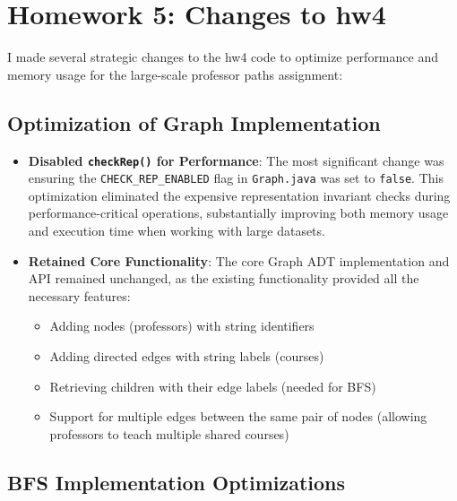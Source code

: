 \documentclass[11pt]{article}
\begin{document}
\section*{Homework 5: Changes to hw4}

I made several strategic changes to the hw4 code to optimize performance and memory usage for the large-scale professor paths assignment:

\subsection*{Optimization of Graph Implementation}

\begin{itemize}
    \item \textbf{Disabled \texttt{checkRep()} for Performance}: The most significant change was ensuring the \texttt{CHECK\_REP\_ENABLED} flag in \texttt{Graph.java} was set to \texttt{false}. This optimization eliminated the expensive representation invariant checks during performance-critical operations, substantially improving both memory usage and execution time when working with large datasets.
    
    \item \textbf{Retained Core Functionality}: The core Graph ADT implementation and API remained unchanged, as the existing functionality provided all the necessary features:
    \begin{itemize}
        \item Adding nodes (professors) with string identifiers
        \item Adding directed edges with string labels (courses)
        \item Retrieving children with their edge labels (needed for BFS)
        \item Support for multiple edges between the same pair of nodes (allowing professors to teach multiple shared courses)
    \end{itemize}
\end{itemize}

\subsection*{BFS Implementation Optimizations}
\end{document}
